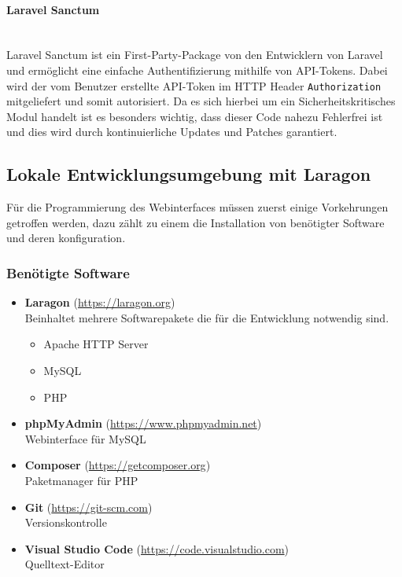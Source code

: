\paragraph{Laravel Sanctum}\mbox{}\\
Laravel Sanctum ist ein First-Party-Package von den Entwicklern von Laravel und
ermöglicht eine einfache Authentifizierung mithilfe von API-Tokens. Dabei wird
der vom Benutzer erstellte API-Token im HTTP Header \verb|Authorization|
mitgeliefert und somit autorisiert. Da es sich hierbei um ein
Sicherheitskritisches Modul handelt ist es besonders wichtig, dass dieser Code
nahezu Fehlerfrei ist und dies wird durch kontinuierliche Updates und Patches
garantiert.
 


\subsection{Lokale Entwicklungsumgebung mit Laragon}
Für die Programmierung des Webinterfaces müssen zuerst einige Vorkehrungen
getroffen werden, dazu zählt zu einem die Installation von benötigter Software
und deren konfiguration.


\subsubsection{Benötigte Software}

\begin{itemize}
  \item \textbf{Laragon} (\url{https://laragon.org}) \\Beinhaltet mehrere
        Softwarepakete die für die Entwicklung notwendig sind.
        \begin{itemize}
          \item Apache HTTP Server
          \item MySQL
          \item PHP
        \end{itemize}
  \item \textbf{phpMyAdmin} (\url{https://www.phpmyadmin.net}) \\ Webinterface
        für MySQL
  \item \textbf{Composer} (\url{https://getcomposer.org}) \\ Paketmanager für
        PHP
  \item \textbf{Git} (\url{https://git-scm.com}) \\ Versionskontrolle
  \item \textbf{Visual Studio Code} (\url{https://code.visualstudio.com}) \\
        Quelltext-Editor
\end{itemize}


